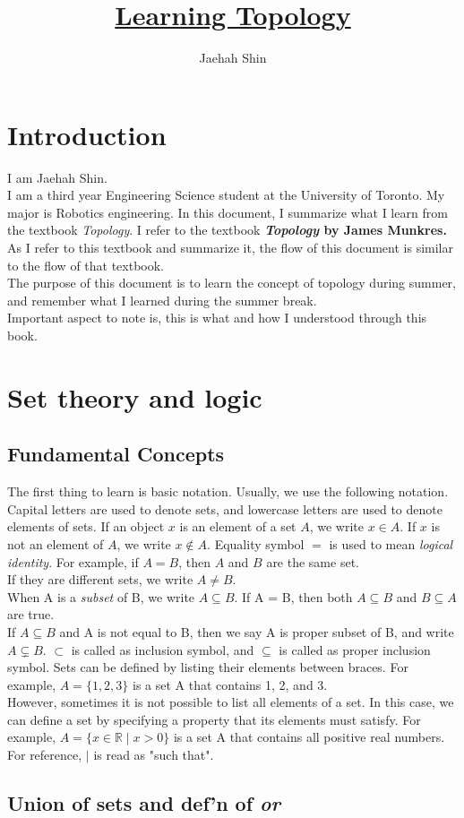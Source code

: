 \documentclass{article}
\title{\underline{\textbf{Learning Topology}}}
\author{Jaehah Shin}
\begin{document}
\maketitle
\tableofcontents

\section{Introduction}
I am Jaehah Shin. \\
I am a third year Engineering Science student at the University of Toronto. My major is Robotics engineering. In this document, I summarize what I learn from the textbook \textit{Topology}. I refer to the textbook \textbf{\textit{Topology } by James Munkres.} As I refer to this textbook and summarize it, the flow of this document is similar to the flow of that textbook. \\
The purpose of this document is to learn the concept of topology during summer, and remember what I learned during the summer break. \\
Important aspect to note is, this is what and how I understood through this book. 

\section{Set theory and logic}
\subsection{Fundamental Concepts}
The first thing to learn is basic notation. Usually, we use the following notation.
Capital letters are used to denote sets, and lowercase letters are used to denote elements of sets.
If an object $x$ is an element of a set $A$, we write $x \in A$. If $x$ is not an element of $A$, we write $x \notin A$.
Equality symbol $=$ is used to mean \textit{logical identity}. For example, if $A = B$, then $A$ and $B$ are the same set. \\
If they are different sets, we write $A \neq B$. \\
When A is a \textit{subset} of B, we write $A \subseteq B$. If A = B, then both $A \subseteq B$ and $B \subseteq A$ are true.\\
If $A \subseteq B$ and A is not equal to B, then we say A is proper subset of B, and write $A \subsetneq B$.
$\subset$ is called as inclusion symbol, and $\subseteq$ is called as proper inclusion symbol. Sets can be defined by listing their elements between braces. For example, $A = \{1, 2, 3\}$ is a set A that contains 1, 2, and 3. \\
However, sometimes it is not possible to list all elements of a set. In this case, we can define a set by specifying a property that its elements must satisfy. For example, $A = \{x \in \mathbb{R} \mid x > 0\}$ is a set A that contains all positive real numbers. \\
For reference, $\mid$ is read as "such that". \\

\subsection{Union of sets and def'n of \textit{or}}
\end{document}
